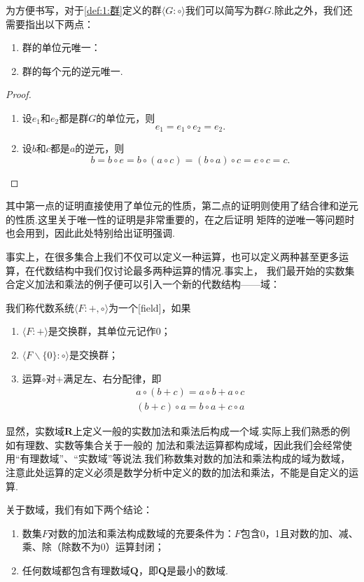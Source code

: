 为方便书写，对于\autoref{def:1:群}定义的群$\langle G:\circ\rangle$我们可以简写为群$G$.除此之外，我们还需要指出以下两点：
\begin{theorem}
    \begin{enumerate}
        \item 群的单位元唯一：
        \item 群的每个元的逆元唯一.
    \end{enumerate}
\end{theorem}
\begin{proof}
    \begin{enumerate}
        \item 设$e_1$和$e_2$都是群$G$的单位元，则
        \[e_1=e_1\circ e_2=e_2.\]
        \item 设$b$和$c$都是$a$的逆元，则
        \[b=b\circ e=b\circ(a\circ c)=(b\circ a)\circ c=e\circ c=c.\]
    \end{enumerate}
\end{proof}

其中第一点的证明直接使用了单位元的性质，第二点的证明则使用了结合律和逆元的性质.这里关于唯一性的证明是非常重要的，在之后证明
矩阵的逆唯一等问题时也会用到，因此此处特别给出证明强调.

事实上，在很多集合上我们不仅可以定义一种运算，也可以定义两种甚至更多运算，在代数结构中我们仅讨论最多两种运算的情况.事实上，
我们最开始的实数集合定义加法和乘法的例子便可以引入一个新的代数结构——域：
\begin{definition}
    我们称代数系统$\langle F:+,\circ\rangle$为一个[field]，如果
    \begin{enumerate}
        \item $\langle F:+\rangle$是交换群，其单位元记作0；

        \item $\langle F\backslash\{0\}:\circ\rangle$是交换群；

        \item 运算$\circ$对$+$满足左、右分配律，即
        \begin{gather*}
            a\circ(b+c)=a\circ b+a\circ c \\
            (b+c)\circ a=b\circ a+c\circ a
        \end{gather*}
    \end{enumerate}
\end{definition}

显然，实数域$\mathbf{R}$上定义一般的实数加法和乘法后构成一个域.实际上我们熟悉的例如有理数、实数等集合关于一般的
加法和乘法运算都构成域，因此我们会经常使用``有理数域''、``实数域''等说法.我们称数集对数的加法和乘法构成的域为数域，
注意此处运算的定义必须是数学分析中定义的数的加法和乘法，不能是自定义的运算.
\begin{theorem}
    关于数域，我们有如下两个结论：
    \begin{enumerate}
        \item 数集$F$对数的加法和乘法构成数域的充要条件为：$F$包含0，1且对数的加、减、乘、除（除数不为0）运算封闭；
        \item 任何数域都包含有理数域$\mathbf{Q}$，即$\mathbf{Q}$是最小的数域.
    \end{enumerate}
\end{theorem}

